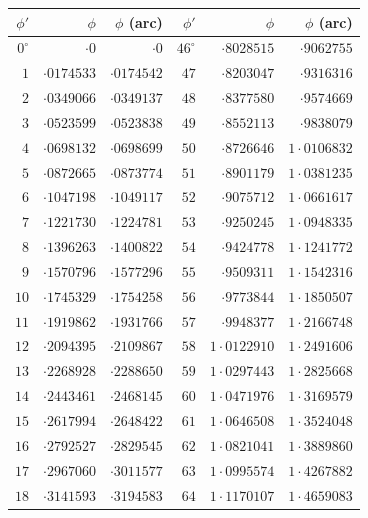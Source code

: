 \documentclass[11pt]{article}
\begin{document}
\begin{center}
\small
\begin{tabular}{|r|r|r||r|r|r|}
\hline
$\phi'$ & $\phi$ & $\phi$ (arc) & $\phi'$ & $\phi$ & $\phi$ (arc) \\
\hline
$0^{\circ}$ & $\cdot 0$ & $\cdot 0$ & $46^{\circ}$ & $\cdot 8028515$ & $\cdot 9062755$ \\
$1$ & $\cdot 0174533$ & $\cdot 0174542$ & $47$ & $\cdot 8203047$ & $\cdot 9316316$ \\
$2$ & $\cdot 0349066$ & $\cdot 0349137$ & $48$ & $\cdot 8377580$ & $\cdot 9574669$ \\
$3$ & $\cdot 0523599$ & $\cdot 0523838$ & $49$ & $\cdot 8552113$ & $\cdot 9838079$ \\
$4$ & $\cdot 0698132$ & $\cdot 0698699$ & $50$ & $\cdot 8726646$ & $1\cdot 0106832$ \\
$5$ & $\cdot 0872665$ & $\cdot 0873774$ & $51$ & $\cdot 8901179$ & $1\cdot 0381235$ \\
$6$ & $\cdot 1047198$ & $\cdot 1049117$ & $52$ & $\cdot 9075712$ & $1\cdot 0661617$ \\
$7$ & $\cdot 1221730$ & $\cdot 1224781$ & $53$ & $\cdot 9250245$ & $1\cdot 0948335$ \\
$8$ & $\cdot 1396263$ & $\cdot 1400822$ & $54$ & $\cdot 9424778$ & $1\cdot 1241772$ \\
$9$ & $\cdot 1570796$ & $\cdot 1577296$ & $55$ & $\cdot 9509311$ & $1\cdot 1542316$ \\
$10$ & $\cdot 1745329$ & $\cdot 1754258$ & $56$ & $\cdot 9773844$ & $1\cdot 1850507$ \\
$11$ & $\cdot 1919862$ & $\cdot 1931766$ & $57$ & $\cdot 9948377$ & $1\cdot 2166748$ \\
$12$ & $\cdot 2094395$ & $\cdot 2109867$ & $58$ & $1\cdot 0122910$ & $1\cdot 2491606$ \\
$13$ & $\cdot 2268928$ & $\cdot 2288650$ & $59$ & $1\cdot 0297443$ & $1\cdot 2825668$ \\
$14$ & $\cdot 2443461$ & $\cdot 2468145$ & $60$ & $1\cdot 0471976$ & $1\cdot 3169579$ \\
$15$ & $\cdot 2617994$ & $\cdot 2648422$ & $61$ & $1\cdot 0646508$ & $1\cdot 3524048$ \\
$16$ & $\cdot 2792527$ & $\cdot 2829545$ & $62$ & $1\cdot 0821041$ & $1\cdot 3889860$ \\
$17$ & $\cdot 2967060$ & $\cdot 3011577$ & $63$ & $1\cdot 0995574$ & $1\cdot 4267882$ \\
$18$ & $\cdot 3141593$ & $\cdot 3194583$ & $64$ & $1\cdot 1170107$ & $1\cdot 4659083$ \\

\end{tabular}
\end{center}
\end{document}
